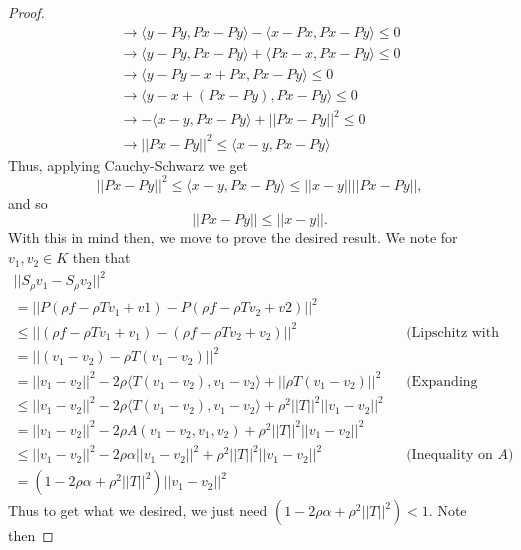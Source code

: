 \documentclass[12pt]{article}
\newenvironment{ex}[2][Exercise]{\begin{trivlist}
\item[\hskip \labelsep {\bfseries #1}\hskip \labelsep {\bfseries #2.}]}{\end{trivlist}}
\begin{document}
\begin{ex}{4}
\begin{enumerate}[label=(\alph*)]
\begin{enumerate}[label=(\arabic*)]
\begin{proof}
\begin{align*}
                    \longrightarrow \langle y - Py, Px - Py \rangle - \langle x - Px, Px - Py \rangle \leq 0 \\
                    \longrightarrow \langle y - Py, Px - Py \rangle + \langle Px - x, Px - Py \rangle \leq 0 \\
                    \longrightarrow \langle y - Py - x + Px, Px - Py \rangle \leq 0 \\
                    \longrightarrow \langle y - x + (Px - Py), Px - Py\rangle \leq 0 \\
                    \longrightarrow -\langle x - y, Px - Py\rangle + ||Px - Py||^2 \leq 0 \\
                    \longrightarrow ||Px - Py||^2 \leq \langle x - y, Px - Py \rangle 
                \end{align*}
                Thus, applying Cauchy-Schwarz we get
                $$||Px - Py||^2 \leq \langle x - y, Px - Py \rangle \leq ||x - y||||Px - Py||,$$
                and so
                $$||Px - Py|| \leq ||x - y||.$$
                With this in mind then, we move to prove the desired result. We note for $v_1, v_2 \in K$ then that 
                \begin{align*}
                    ||S_\rho v_1 - S_\rho v_2||^2 \\
                    = ||P(\rho f - \rho Tv_1 + v1) - P(\rho f - \rho Tv_2 + v2)||^2 \\
                    \leq ||(\rho f - \rho Tv_1 + v_1) - (\rho f - \rho Tv_2 + v_2)||^2 && \text{(Lipschitz with 1)} \\
                    = ||(v_1 - v_2) - \rho T(v_1 - v_2)||^2 \\
                    = ||v_1 - v_2||^2 - 2\rho \langle T(v_1 - v_2), v_1 - v_2 \rangle + ||\rho T(v_1 - v_2)||^2 && \text{(Expanding inner product)} \\
                    \leq ||v_1 - v_2||^2 - 2\rho \langle T(v_1 - v_2), v_1 - v_2 \rangle + \rho^2 ||T||^2||v_1 - v_2||^2 \\
                    = ||v_1 - v_2||^2 - 2\rho A(v_1 - v_2, v_1, v_2) + \rho^2 ||T||^2||v_1 - v_2||^2 \\
                    \leq ||v_1 - v_2||^2 - 2\rho \alpha ||v_1 - v_2||^2 + \rho^2 ||T||^2||v_1 - v_2||^2 && \text{(Inequality on }A)\\
                    = (1 - 2\rho\alpha + \rho^2||T||^2)||v_1 - v_2||^2
                \end{align*}
                Thus to get what we desired, we just need $(1 - 2\rho\alpha + \rho^2||T||^2) < 1$. Note then 

\end{proof}
\end{enumerate}
\end{enumerate}
\end{ex}
\end{document}
